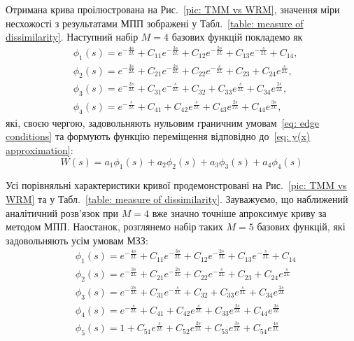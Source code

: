 \documentclass{mathreport}
\begin{document}
Отримана крива проілюстрована на Рис.~\ref{pic: TMM vs WRM}, значення міри несхожості з результатами МПП зображені у Табл.~\ref{table: measure of dissimilarity}. Наступний набір $M=4$ базових функцій покладемо як 
\begin{align}
    & \phi_1(s) = e^{-\frac{4s}{2L}} + C_{11}e^{-\frac{3s}{2L}} + C_{12}e^{-\frac{2s}{2L}} + C_{13}e^{-\frac{s}{2L}} + C_{14}, \label{eq: M=4 trial phi1(x)} \\
    & \phi_2(s) = e^{-\frac{3s}{2L}} + C_{21}e^{-\frac{2s}{2L}} + C_{22}e^{-\frac{s}{2L}} + C_{23} + C_{24}e^{\frac{s}{2L}}, \label{eq: M=4 trial phi2(x)} \\
    & \phi_3(s) = e^{-\frac{2s}{2L}} + C_{31}e^{-\frac{s}{2L}} + C_{32} + C_{33}e^{\frac{s}{2L}} + C_{34}e^{\frac{2s}{2L}}, \label{eq: M=4 trial phi3(x)} \\
    & \phi_4(s) = e^{-\frac{s}{2L}} + C_{41} + C_{42}e^{\frac{s}{2L}} + C_{43}e^{\frac{2s}{2L}} + C_{44}e^{\frac{3s}{2L}}, \label{eq: M=4 trial phi4(x)}
\end{align}
які, своєю чергою, задовольняють нульовим граничним умовам~\eqref{eq: edge conditions} та формують функцію переміщення відповідно до~\eqref{eq: y(x) approximation}:
\begin{equation}\label{eq: W(s) M=4 approximation}
    W(s) = a_1\phi_1(s) + a_2\phi_2(s) + a_3\phi_3(s) + a_4\phi_4(s)
\end{equation}

Усі порівняльні характеристики кривої продемонстровані на Рис.~\ref{pic: TMM vs WRM} та у Табл.~\ref{table: measure of dissimilarity}. Зауважуємо, що наближений аналітичний розв'язок при $M=4$ вже значно точніше апроксимує криву за методом МПП. Наостанок, розглянемо набір таких $M=5$ базових функцій, які задовольняють усім умовам МЗЗ:
\begin{align}
    & \phi_1(s) = e^{-\frac{4s}{2L}} + C_{11}e^{-\frac{3s}{2L}} + C_{12}e^{-\frac{2s}{2L}} + C_{13}e^{-\frac{s}{2L}} + C_{14} \label{eq: M=5 trial phi1(x)} \\
    & \phi_2(s) = e^{-\frac{3s}{2L}} + C_{21}e^{-\frac{2s}{2L}} + C_{22}e^{-\frac{s}{2L}} + C_{23} + C_{24}e^{\frac{s}{2L}} \label{eq: M=5 trial phi2(x)} \\
    & \phi_3(s) = e^{-\frac{2s}{2L}} + C_{31}e^{-\frac{s}{2L}} + C_{32} + C_{33}e^{\frac{s}{2L}} + C_{34}e^{\frac{2s}{2L}} \label{eq: M=5 trial phi3(x)} \\
    & \phi_4(s) = e^{-\frac{s}{2L}} + C_{41} + C_{42}e^{\frac{s}{2L}} + C_{33}e^{\frac{2s}{2L}} + C_{44}e^{\frac{3s}{2L}} \label{eq: M=5 trial phi4(x)} \\
    & \phi_5(s) = 1 + C_{51}e^{\frac{s}{2L}} + C_{52}e^{\frac{2s}{2L}} + C_{53}e^{\frac{3s}{2L}} + C_{54}e^{\frac{4s}{2L}} \label{eq: M=5 trial phi5(x)}
\end{align}
\end{document}
